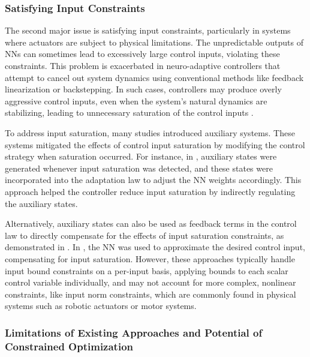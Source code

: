 \documentclass[journal]{IEEEtran}
\begin{document}
\hfill

\subsubsection{Satisfying Input Constraints}

The second major issue is satisfying input constraints, particularly in systems where actuators are subject to physical limitations. 
The unpredictable outputs of NNs can sometimes lead to excessively large control inputs, violating these constraints. 
This problem is exacerbated in neuro-adaptive controllers that attempt to cancel out system dynamics using conventional methods like feedback linearization or backstepping. 
In such cases, controllers may produce overly aggressive control inputs, even when the system's natural dynamics are stabilizing, leading to unnecessary saturation of the control inputs \cite{Khalil:2002aa}.

To address input saturation, many studies introduced auxiliary systems. 
These systems mitigated the effects of control input saturation by modifying the control strategy when saturation occurred. 
For instance, in \cite{Esfandiari:2014aa,Karason:1994aa,Esfandiari:2015aa}, auxiliary states were generated whenever input saturation was detected, and these states were incorporated into the adaptation law to adjust the NN weights accordingly. 
This approach helped the controller reduce input saturation by indirectly regulating the auxiliary states.

Alternatively, auxiliary states can also be used as feedback terms in the control law to directly compensate for the effects of input saturation constraints, as demonstrated in \cite{Arefinia:2020aa,He:2016aa,Peng:2020aa}. 
In \cite{Gao:2006aa}, the NN was used to approximate the desired control input, compensating for input saturation. 
However, these approaches typically handle input bound constraints on a per-input basis, \ie applying bounds to each scalar control variable individually, and may not account for more complex, nonlinear constraints, like input norm constraints, which are commonly found in physical systems such as robotic actuators or motor systems.

\hfill

\subsubsection{Limitations of Existing Approaches and Potential of Constrained Optimization}
\end{document}

